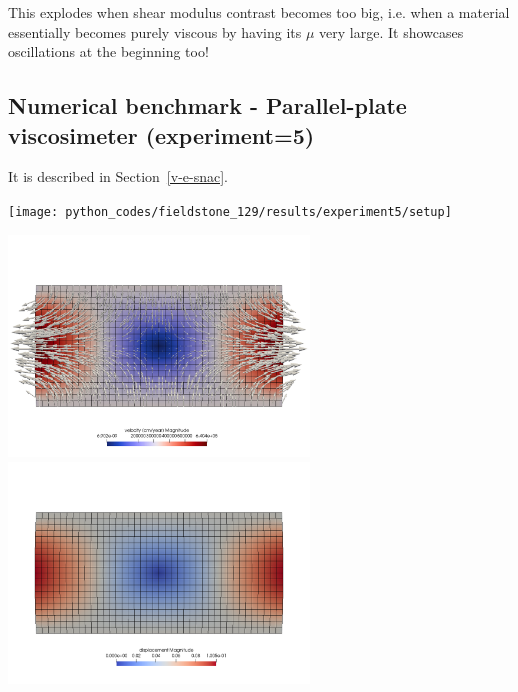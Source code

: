 {\color{red}This explodes when shear modulus contrast becomes too big, i.e. when a material 
essentially becomes purely viscous by having its $\mu$ very large. }
It showcases oscillations at the beginning too!

\subsection*{Numerical benchmark - Parallel-plate viscosimeter (experiment=5)}

It is described in Section~\ref{v-e-snac}.


\begin{center}
\texttt{[image: python\_codes/fieldstone\_129/results/experiment5/setup]}
\end{center}

\begin{center}
\includegraphics[width=8cm]{python_codes/fieldstone_129/results/experiment5/vel}
\includegraphics[width=8cm]{python_codes/fieldstone_129/results/experiment5/disp}
\end{center}

